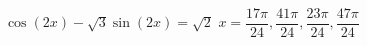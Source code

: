 { $\cos(2x) - \sqrt{3} \sin(2x) = \sqrt{2}$}
{ $x = \dfrac{17 \pi}{24}, \dfrac{41 \pi}{24}, \dfrac{23\pi}{24}, \dfrac{47\pi}{24}$}
